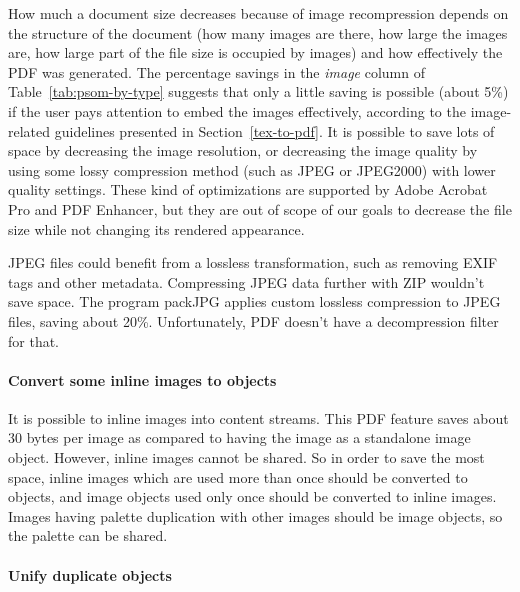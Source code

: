 \documentclass{ltugproc}
\begin{document}
How much a document size decreases because of image recompression depends on
the structure of the document (how many images are there, how large the
images are, how large part of the file size is occupied by images) and how
effectively the PDF was generated. The percentage savings in the
\emph{image} column of Table~\ref{tab:psom-by-type} suggests that only a little
saving is possible (about 5\%) if the user pays attention to embed the
images effectively, according to the image-related guidelines presented in
Section~\ref{tex-to-pdf}. It is possible to save lots of space by decreasing
the image resolution, or decreasing the image quality by using some lossy
compression method (such as JPEG or JPEG2000) with lower quality settings.
These kind of optimizations are supported by Adobe Acrobat Pro and PDF Enhancer,
but they are out of scope of our goals to decrease the file size while not
changing its rendered appearance.

JPEG files could benefit from a lossless transformation, such as removing
EXIF tags and other metadata. Compressing JPEG data further with ZIP
wouldn't save space. The program packJPG \cite{packJPG} applies custom lossless
compression to JPEG files, saving about 20\%. Unfortunately, PDF doesn't
have a decompression filter for that.

\paragraph{Convert some inline images to objects}

It is possible to inline images into content streams. This PDF feature saves
about 30 bytes per image as compared to having the image as a standalone
image object. However, inline images cannot be shared. So in order to save
the most space, inline images which are used more than once should be
converted to objects, and image objects used only once should be converted
to inline images. Images having palette duplication with other images should
be image objects, so the palette can be shared.

\paragraph{Unify duplicate objects}
\end{document}
